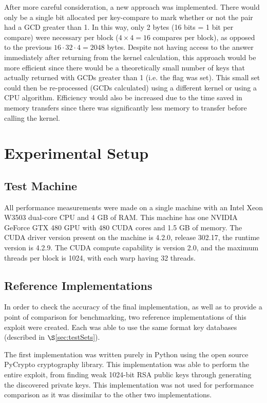\documentclass[12pt]{ucthesis}
\begin{document}
After more careful consideration, a new approach was implemented. There would 
only be a single bit allocated per key-compare to mark whether or not the pair 
had a GCD greater than 1. In this way, only 2 bytes (16 bits = 1 bit per 
compare) were necessary per block ($4\times4 = 16$ compares per block), as 
opposed to the previous $16 \cdot 32 \cdot 4 = 2048$ bytes. Despite not having access 
to the answer immediately after returning from the kernel calculation, this 
approach would be more efficient since there would be a theoretically small 
number of keys that actually returned with GCDs greater than 1 (i.e. the flag 
was set). This small set could then be re-processed (GCDs calculated) using a 
different kernel or using a CPU algorithm. Efficiency would also be increased 
due to the time saved in memory transfers since there was significantly less 
memory to transfer before calling the kernel.

\section{Experimental Setup}
\label{sec:expsetup}
\subsection{Test Machine}
\label{subsec:testmachine}
All performance measurements were made on a single machine with an Intel Xeon 
W3503 dual-core CPU and 4 GB of RAM. This machine has one NVIDIA GeForce
GTX 480 GPU with 480 CUDA cores and 1.5 GB of memory. The CUDA driver 
version present on the machine is 4.2.0, release 302.17, the runtime version is
4.2.9. The CUDA compute capability is version 2.0, and the maximum threads per 
block is 1024, with each warp having 32 threads.

\subsection{Reference Implementations}
\label{subsec:refimpl}
In order to check the accuracy of the final implementation, as well as to 
provide a point of comparison for benchmarking, two reference implementations 
of this exploit were created. Each was able to use the same format key 
databases (described in $\S$\ref{sec:testSets}). 

The first implementation was written purely in Python using the open source
PyCrypto cryptography library. %
This implementation was able to perform the entire exploit, from finding 
weak 1024-bit RSA public keys through generating the discovered private keys. 
This implementation was not used for performance comparison as it was
dissimilar to the other two implementations.
\end{document}
